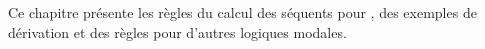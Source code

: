 \documentclass[../../../include/open-logic-chapter]{subfiles}
\begin{document}
Ce chapitre présente les règles du calcul des séquents pour ,
des exemples de dérivation et des règles pour d'autres logiques modales.


\OLEndChapterHook
\end{document}
